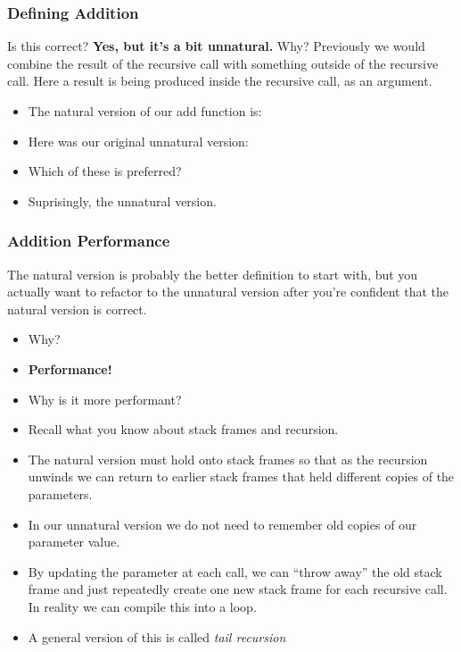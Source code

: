 \documentclass{beamer}
\begin{document}

\begin{frame}
  \frametitle{Defining Addition}
 Is this correct?
 \textbf{Yes, but it's a bit unnatural.} Why?
  Previously we would combine the result of the recursive call with
  something outside of the recursive call. Here a result is being
  produced inside the recursive call, as an argument.
  \begin{itemize}
  \item<2-> The natural version of our add function is:
    \addNatural
  \item<3-> Here was our original unnatural version:
    \addTail
  \item<4-> Which of these is preferred?
  \item<5-> Suprisingly, the unnatural version.  
  \end{itemize}
\end{frame}

\begin{frame}
  \frametitle{Addition Performance}
  The natural version is probably the better definition
  to start with, but you actually want to refactor to the unnatural
  version after you're confident that the natural version is
  correct.
  \begin{itemize}
  \item<2-> Why?
  \item<3-> \textbf{Performance!}
  \item<4-> Why is it more performant?
  \item<5-> Recall what you know about stack frames and recursion.
  \item<6-> The natural version must hold onto stack frames so that
    as the recursion unwinds we can return to earlier stack frames
    that held different copies of the parameters.
  \item<7-> In our unnatural version we do not need to remember old copies
    of our parameter value.
  \item<8-> By updating the parameter at each call, we can ``throw away''
    the old stack frame and just repeatedly create one new stack frame
    for each recursive call. In reality we can compile this into a loop.
  \item<9-> A general version of this is called \emph{tail recursion}
  \end{itemize}      
\end{frame}
\end{document}
